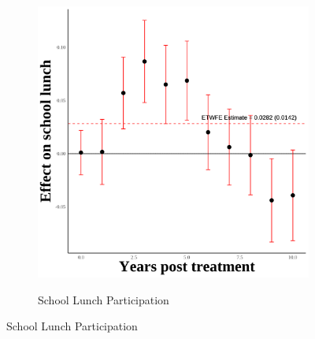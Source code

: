\documentclass[12pt,english]{article}
\begin{document}
\begin{figure}[H]
\begin{subfigure}[b]{0.3\textwidth}
    \label{fig:ln-schl-lunch-third-one}
  \end{subfigure}
  \hfill
  \begin{subfigure}[b]{0.3\textwidth}
    \centering
    \caption{School Lunch Participation}
    \includegraphics[width=\linewidth]{figures/plot59-schl_lunch_event_study-third-one.png}
    \label{fig:schl-lunch-third-one}
  \end{subfigure}

  \vspace{0.3cm} %


\end{figure}
\end{document}
